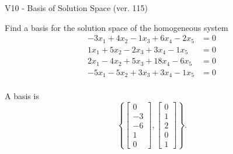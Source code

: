 \begin{exercise}
  \begin{exerciseTitle}V10 - Basis of Solution Space (ver. 115)\end{exerciseTitle}
  \begin{exerciseStatement}
    Find a basis for the solution space of the homogeneous system 
\begin{align*}
 -3 x_ 1 + 4 x_ 2 -1 x_ 3 + 6 x_ 4 -2 x_ 5 &= 0  \\ 
  1 x_ 1 + 5 x_ 2 -2 x_ 3 + 3 x_ 4 -1 x_ 5 &= 0  \\ 
  2 x_ 1 -4 x_ 2 + 5 x_ 3 + 18 x_ 4 -6 x_ 5 &= 0  \\ 
  -5 x_ 1 -5 x_ 2 + 3 x_ 3 + 3 x_ 4 -1 x_ 5 &= 0  \\ 
 \end{align*}


 
  \end{exerciseStatement}

  \begin{exerciseAnswer}
   A basis is   
\[\left\{\left[\begin{array}{c}
0 \\
-3 \\
-6 \\
1 \\
0
\end{array}\right] , \left[\begin{array}{c}
0 \\
1 \\
2 \\
0 \\
1
\end{array}\right]\right\}.\]

  


  \end{exerciseAnswer}
\end{exercise}
